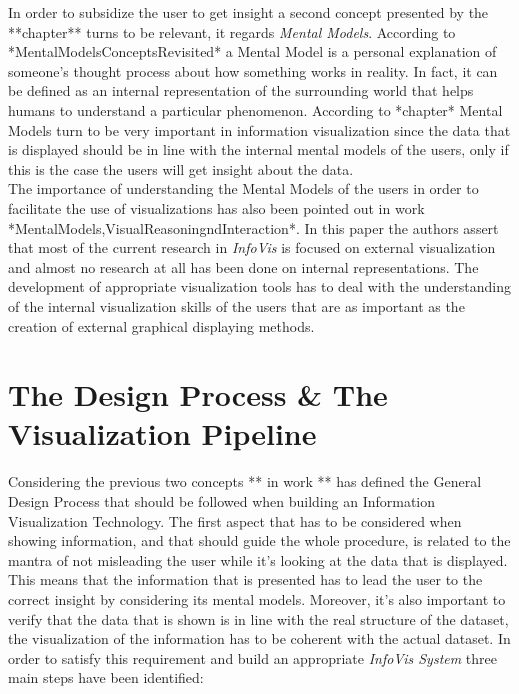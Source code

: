 \documentclass[10p,letterpaper]{article}
\begin{document}
In order to subsidize the user to get insight a second concept presented by the **chapter** turns to be relevant, it regards \textit{Mental Models}. According to *MentalModelsConceptsRevisited* a Mental Model is a personal explanation of someone's thought process about how something works in reality. In fact, it can be defined as an internal representation of the surrounding world that helps humans to understand a particular phenomenon. According to *chapter* Mental Models turn to be very important in information visualization since the data that is displayed should be in line with the internal mental models of the users, only if this is the case the users will get insight about the data.\\
The importance of understanding the Mental Models of the users in order to facilitate the use of visualizations has also been pointed out in work *MentalModels,VisualReasoningndInteraction*. In this paper the authors assert that most of the current research in \textit{InfoVis} is focused on external visualization and almost no research at all has been done on internal representations. The development of appropriate visualization tools has to deal with the understanding of the internal visualization skills of the users that are as important as the creation of external graphical displaying methods.\\
 	
\section{The Design Process \& The Visualization Pipeline}

Considering the previous two concepts ** in work ** has defined the General Design Process that should be followed when building an Information Visualization Technology. The first aspect that has to be considered when showing information, and that should guide the whole procedure, is related to the mantra of not misleading the user while it's looking at the data that is displayed. This means that the information that is presented has to lead the user to the correct insight by considering its mental models. Moreover, it's also important to verify that the data that is shown is in line with the real structure of the dataset, the visualization of the information has to be coherent with the actual dataset. In order to satisfy this requirement and build an appropriate \textit{InfoVis System} three main steps have been identified:
\end{document}
